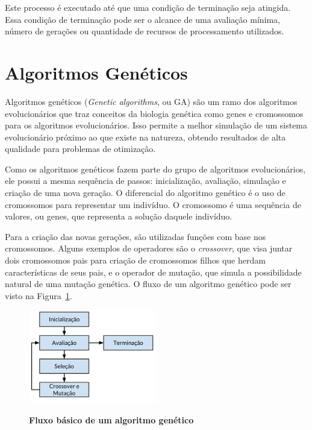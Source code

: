 \documentclass[12pt,oneside,a4paper,english,french,spanish,brazil,]{abntex2}
\begin{document}
Este processo é executado até que uma condição de terminação seja atingida. Essa condição de terminação pode ser o alcance de uma avaliação mínima, número de gerações ou quantidade de recursos de processamento utilizados.

\section{Algoritmos Genéticos}

Algoritmos genéticos (\textit{Genetic algorithms}, ou GA) são um ramo dos algoritmos evolucionários que traz conceitos da biologia genética como genes e cromossomos para os algoritmos evolucionários. Isso permite a melhor simulação de um sistema evolucionário próximo ao que existe na natureza, obtendo resultados de alta qualidade para problemas de otimização.

Como os algoritmos genéticos fazem parte do grupo de algoritmos evolucionários, ele possui a mesma sequência de passos: inicialização, avaliação, simulação e criação de uma nova geração. O diferencial do algoritmo genético é o uso de cromossomos para representar um indivíduo. O cromossomo é uma sequência de valores, ou genes, que representa a solução daquele indivíduo.

Para a criação das novas gerações, são utilizadas funções com base nos cromossomos. Alguns exemplos de operadores são o \textit{crossover}, que visa juntar dois cromossomos pais para criação de cromossomos filhos que herdam características de seus pais, e o operador de mutação, que simula a possibilidade natural de uma mutação genética. O fluxo de um algoritmo genético pode ser visto na Figura~\ref{fig:GA_luxo}.

\begin{figure}[ht]
\centering
\caption{\textbf{Fluxo básico de um algoritmo genético}}
\includegraphics[width=0.5\textwidth]{imagens/GA_Fluxo.pdf}
\label{fig:GA_luxo}
\end{figure}
\end{document}

